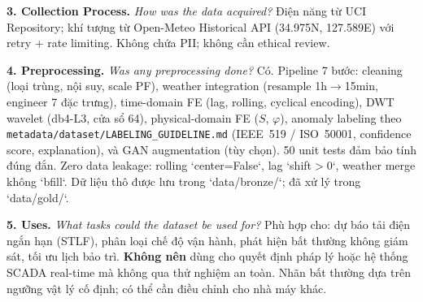 \documentclass[conference]{IEEEtran}
\begin{document}
\noindent\textbf{3. Collection Process.}
\textit{How was the data acquired?}
Điện năng từ UCI Repository; khí tượng từ Open-Meteo Historical API (34.975\textdegree{}N, 127.589\textdegree{}E) với retry + rate limiting.
Không chứa PII; không cần ethical review.

\noindent\textbf{4. Preprocessing.}
\textit{Was any preprocessing done?}
Có. Pipeline 7 bước: cleaning (loại trùng, nội suy, scale PF), weather integration (resample 1h$\rightarrow$15min, engineer 7 đặc trưng), time-domain FE (lag, rolling, cyclical encoding), DWT wavelet (db4-L3, cửa sổ 64), physical-domain FE ($S$, $\varphi$), anomaly labeling theo \texttt{metadata/dataset/LABELING\_GUIDELINE.md} (IEEE~519 / ISO~50001, confidence score, explanation), và GAN augmentation (tùy chọn).
50 unit tests đảm bảo tính đúng đắn.
Zero data leakage: rolling `center=False`, lag `shift$>$0`, weather merge không `bfill`.
Dữ liệu thô được lưu trong `data/bronze/`; đã xử lý trong `data/gold/`.

\noindent\textbf{5. Uses.}
\textit{What tasks could the dataset be used for?}
Phù hợp cho: dự báo tải điện ngắn hạn (STLF), phân loại chế độ vận hành, phát hiện bất thường không giám sát, tối ưu lịch bảo trì.
\textbf{Không nên} dùng cho quyết định pháp lý hoặc hệ thống SCADA real-time mà không qua thử nghiệm an toàn.
Nhãn bất thường dựa trên ngưỡng vật lý cố định; có thể cần điều chỉnh cho nhà máy khác.
\end{document}

